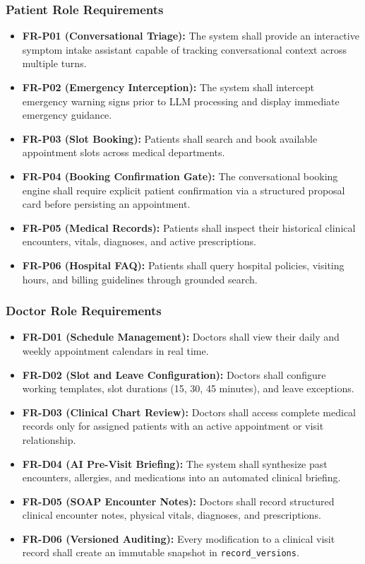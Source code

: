\documentclass[conference]{IEEEtran}
\begin{document}
\subsubsection{Patient Role Requirements}
\begin{itemize}
    \item \textbf{FR-P01 (Conversational Triage):} The system shall provide an interactive symptom intake assistant capable of tracking conversational context across multiple turns.
    \item \textbf{FR-P02 (Emergency Interception):} The system shall intercept emergency warning signs prior to LLM processing and display immediate emergency guidance.
    \item \textbf{FR-P03 (Slot Booking):} Patients shall search and book available appointment slots across medical departments.
    \item \textbf{FR-P04 (Booking Confirmation Gate):} The conversational booking engine shall require explicit patient confirmation via a structured proposal card before persisting an appointment.
    \item \textbf{FR-P05 (Medical Records):} Patients shall inspect their historical clinical encounters, vitals, diagnoses, and active prescriptions.
    \item \textbf{FR-P06 (Hospital FAQ):} Patients shall query hospital policies, visiting hours, and billing guidelines through grounded search.
\end{itemize}

\subsubsection{Doctor Role Requirements}
\begin{itemize}
    \item \textbf{FR-D01 (Schedule Management):} Doctors shall view their daily and weekly appointment calendars in real time.
    \item \textbf{FR-D02 (Slot and Leave Configuration):} Doctors shall configure working templates, slot durations (15, 30, 45 minutes), and leave exceptions.
    \item \textbf{FR-D03 (Clinical Chart Review):} Doctors shall access complete medical records only for assigned patients with an active appointment or visit relationship.
    \item \textbf{FR-D04 (AI Pre-Visit Briefing):} The system shall synthesize past encounters, allergies, and medications into an automated clinical briefing.
    \item \textbf{FR-D05 (SOAP Encounter Notes):} Doctors shall record structured clinical encounter notes, physical vitals, diagnoses, and prescriptions.
    \item \textbf{FR-D06 (Versioned Auditing):} Every modification to a clinical visit record shall create an immutable snapshot in \texttt{record\_versions}.
\end{itemize}
\end{document}
